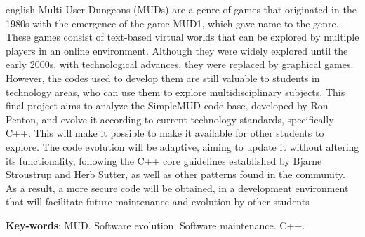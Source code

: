 \begin{resumo}[Abstract]
  \begin{otherlanguage*}{english}
    Multi-User Dungeons (MUDs) are a genre of games that originated in the 1980s with the emergence of 
    the game MUD1, which gave name to the genre. These games consist of text-based virtual worlds that 
    can be explored by multiple players in an online environment. Although they were widely explored 
    until the early 2000s, with technological advances, they were replaced by graphical games. However, 
    the codes used to develop them are still valuable to students in technology areas, who can use them 
    to explore multidisciplinary subjects. This final project aims to analyze the SimpleMUD code base, 
    developed by Ron Penton, and evolve it according to current technology standards, specifically C++. 
    This will make it possible to make it available for other students to explore. The code evolution 
    will be adaptive, aiming to update it without altering its functionality, following the C++ core
    guidelines established by Bjarne Stroustrup and Herb Sutter, as well as other patterns found in the 
    community. As a result, a more secure code will be obtained, in a development environment that will 
    facilitate future maintenance and evolution by other students
    \vspace{\onelineskip}
 
    \noindent 
    \textbf{Key-words}: MUD. Software evolution. Software maintenance. C++.
  \end{otherlanguage*}
\end{resumo}
